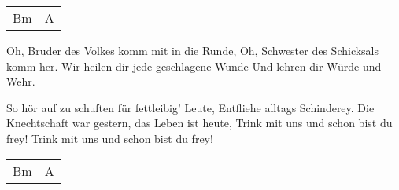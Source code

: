 \begin{guitar}
	 {\footnotesize\begin{tabular}{|l|l|}
			Bm & A
		\end{tabular} }
	
	Oh, Bruder des Volkes komm mit in die Runde,
	Oh, Schwester des Schicksals komm her.
	Wir heilen dir jede geschlagene Wunde
	Und lehren dir Würde und Wehr.
	
	So hör auf zu schuften für fettleibig' Leute,
	Entfliehe alltags Schinderey.
	Die Knechtschaft war gestern, das Leben ist heute,
	Trink mit uns und schon bist du frey!
	Trink mit uns und schon bist du frey!
	
	\begin{highlightbar}
		 
	\end{highlightbar}
	
	 {\footnotesize\begin{tabular}{|l|l|}
			Bm & A
		\end{tabular} }
\end{guitar}